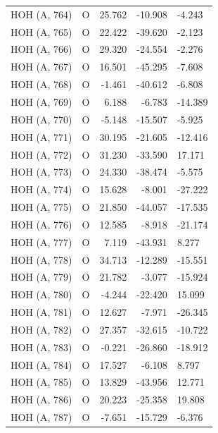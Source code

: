 \begin{longtable}{@{}lcrr@{}}
  \cmidrule(r){1-5}
  HOH (A, 764) & O & 25.762 & -10.908 & -4.243 \\
  \cmidrule(r){1-5}
  HOH (A, 765) & O & 22.422 & -39.620 & -2.123 \\
  \cmidrule(r){1-5}
  HOH (A, 766) & O & 29.320 & -24.554 & -2.276 \\
  \cmidrule(r){1-5}
  HOH (A, 767) & O & 16.501 & -45.295 & -7.608 \\
  \cmidrule(r){1-5}
  HOH (A, 768) & O & -1.461 & -40.612 & -6.808 \\
  \cmidrule(r){1-5}
  HOH (A, 769) & O & 6.188 & -6.783 & -14.389 \\
  \cmidrule(r){1-5}
  HOH (A, 770) & O & -5.148 & -15.507 & -5.925 \\
  \cmidrule(r){1-5}
  HOH (A, 771) & O & 30.195 & -21.605 & -12.416 \\
  \cmidrule(r){1-5}
  HOH (A, 772) & O & 31.230 & -33.590 & 17.171 \\
  \cmidrule(r){1-5}
  HOH (A, 773) & O & 24.330 & -38.474 & -5.575 \\
  \cmidrule(r){1-5}
  HOH (A, 774) & O & 15.628 & -8.001 & -27.222 \\
  \cmidrule(r){1-5}
  HOH (A, 775) & O & 21.850 & -44.057 & -17.535 \\
  \cmidrule(r){1-5}
  HOH (A, 776) & O & 12.585 & -8.918 & -21.174 \\
  \cmidrule(r){1-5}
  HOH (A, 777) & O & 7.119 & -43.931 & 8.277 \\
  \cmidrule(r){1-5}
  HOH (A, 778) & O & 34.713 & -12.289 & -15.551 \\
  \cmidrule(r){1-5}
  HOH (A, 779) & O & 21.782 & -3.077 & -15.924 \\
  \cmidrule(r){1-5}
  HOH (A, 780) & O & -4.244 & -22.420 & 15.099 \\
  \cmidrule(r){1-5}
  HOH (A, 781) & O & 12.627 & -7.971 & -26.345 \\
  \cmidrule(r){1-5}
  HOH (A, 782) & O & 27.357 & -32.615 & -10.722 \\
  \cmidrule(r){1-5}
  HOH (A, 783) & O & -0.221 & -26.860 & -18.912 \\
  \cmidrule(r){1-5}
  HOH (A, 784) & O & 17.527 & -6.108 & 8.797 \\
  \cmidrule(r){1-5}
  HOH (A, 785) & O & 13.829 & -43.956 & 12.771 \\
  \cmidrule(r){1-5}
  HOH (A, 786) & O & 20.223 & -25.358 & 19.808 \\
  \cmidrule(r){1-5}
  HOH (A, 787) & O & -7.651 & -15.729 & -6.376 \\

\end{longtable}
